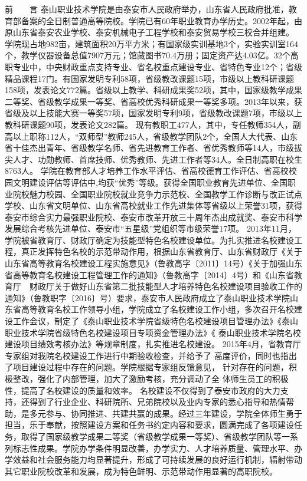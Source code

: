 前　　言
泰山职业技术学院是由泰安市人民政府举办，山东省人民政府批准，教育部备案的全日制普通高等院校。学院已有60年职业教育办学历史。2002年起，由原山东省泰安农业学校、泰安机械电子工程学校和泰安贸易学校三校合并组建。
学院现占地982亩，建筑面积20万平方米；有国家级实训基地3个，实验实训室164个，教学仪器设备总值7907万元；馆藏图书70.4万册；固定资产达4.03亿。32个高职专业中，中央财政重点支持专业、省名校重点建设专业、省特色专业12个；省级精品课程17门。有国家发明专利58项，省级教改课题15项，市级以上教科研课题158项，发表论文772篇。省级以上教学、科研成果奖52项，其中，国家级教学成果二等奖、省级教学成果一等奖、省高校优秀科研成果一等奖多项。2013年以来，获省级及以上技能大赛一等奖57项，国家发明专利9项，省级教改课题7项，市级以上教科研课题90项，发表论文282篇。
现有教职工477人，其中，专任教师354人，副高以上职称112人，“双师型”教师245人，省级教学团队2个，全国人大代表、山东省十佳杰出青年、省级教学名师、省先进教育工作者、省优秀教师等14人，市级拔尖人才、功勋教师、首席技师、优秀教师、先进工作者等34人。全日制高职在校生8763人。
学院在教育部人才培养工作水平评估、省高校德育工作评估、省高校校园文明建设评估等评估中,均获“优秀”等级。获得全国职业教育先进单位、全国职业院校魅力校园、全国职业院校就业竞争力示范校、全国教学工作诊断与改正试点学校、山东省文明单位、山东省高校就业工作先进集体等省级以上荣誉31项，获得泰安市综合实力最强职业院校、泰安市改革开放三十周年杰出成就奖、泰安市科学发展综合考核先进单位、泰安市“五星级”党组织等市级荣誉17项。
2013年11月，学院被省教育厅、财政厅确定为技能型特色名校建设单位。为扎实推进名校建设工程，真正发挥特色名校的示范带动作用，根据山东省教育厅、山东省财政厅《关于山东省高等教育名校建设工程实施意见》（鲁教高字〔2011〕14号）《关于加强山东省高等教育名校建设工程管理工作的通知》（鲁教高字〔2014〕4号）和《山东省教育厅　财政厅关于做好山东省第二批技能型人才培养特色名校建设项目验收工作的通知》（鲁教职字〔2016〕号）要求，泰安市人民政府成立了泰山职业技术学院山东省高等教育名校工作领导小组，学院成立了名校建设工作小组，多次召开名校建设工作会议，制定了《泰山职业技术学院省级特色名校建设项目管理办法》《泰山职业技术学院省级特色名校建设项目专项资金管理办法》《 泰山职业技术学院名校建设项目绩效考核办法》等规章制度，扎实推进名校建设。
2015年4月，省教育厅专家组对我院名校建设工作进行中期验收检查，并给予了
高度评价，同时也指出了项目建设过程中存在的问题。学院根据专家组反馈意见，
针对存在的问题，积极整改，强化了内部管理，加大了激励考核，充分调动了全
体师生员工的积极性，提高了名校建设的质量和效率。
名校建设不仅得到了泰安市政府的大力支持，还得到了行业企业、科研院所、兄弟院校以及业内专家的悉心指导和热情帮助，是多元参与、协同推进、共建共赢的成果。经过三年建设，学院全体师生勇于担当，乐于奉献，按照建设方案和任务书约定内容和要求，圆满完成了各项建设任务，取得了国家级教学成果二等奖（省级教学成果一等奖）、省级教学团队等一系列标志性成果。学院办学条件明显改善，办学实力、人才培养质量、管理水平、办学效益和社会服务能力均显著提升，形成了可持续发展的良好运行机制，辐射带动其它职业院校改革和发展，成为特色鲜明、示范带动作用显著的高职院校。 

